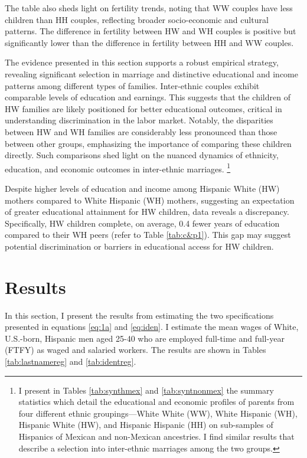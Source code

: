 \documentclass[12pt,english]{article}
\begin{document}
The table also sheds light on fertility trends, noting that WW couples have less children than HH couples, reflecting broader socio-economic and cultural patterns. The difference in fertility between HW and WH couples is positive but significantly lower than the difference in fertility between HH and WW couples.

The evidence presented in this section supports a robust empirical strategy, revealing significant selection in marriage and distinctive educational and income patterns among different types of families. Inter-ethnic couples exhibit comparable levels of education and earnings. This suggests that the children of HW families are likely positioned for better educational outcomes, critical in understanding discrimination in the labor market. Notably, the disparities between HW and WH families are considerably less pronounced than those between other groups, emphasizing the importance of comparing these children directly. Such comparisons shed light on the nuanced dynamics of ethnicity, education, and economic outcomes in inter-ethnic marriages. \footnote{I present in Tables \ref{tab:synthmex} and \ref{tab:syntnonmex} the summary statistics which detail the educational and economic profiles of parents from four different ethnic groupings—White White (WW), White Hispanic (WH), Hispanic White (HW), and Hispanic Hispanic (HH) on sub-samples of Hispanics of Mexican and non-Mexican ancestries. I find similar results that describe a selection into inter-ethnic marriages among the two groups.} 

Despite higher levels of education and income among Hispanic White (HW) mothers compared to White Hispanic (WH) mothers, suggesting an expectation of greater educational attainment for HW children, data reveals a discrepancy. Specifically, HW children complete, on average, 0.4 fewer years of education compared to their WH peers (refer to Table \ref{tab:c&p1}). This gap may suggest potential discrimination or barriers in educational access for HW children.

\section{Results}\label{sec:results}

In this section, I present the results from estimating the two specifications presented in equations \ref{eq:1a} and \ref{eq:iden}. I estimate the mean wages of White, U.S.-born, Hispanic men aged 25-40 who are employed full-time and full-year (FTFY) as waged and salaried workers. The results are shown in Tables \ref{tab:lastnamereg} and \ref{tab:identreg}.
\end{document}
